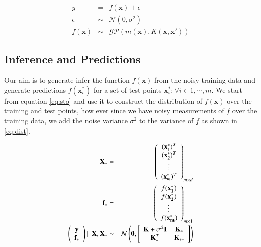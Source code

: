\documentclass[referee,a4paper,12pt,traditabstract]{swsc}
\begin{document}
\begin{linenumbers}
\begin{eqnarray}
      y & = & f(\mathbf{x}) + \epsilon  \\
      \epsilon & \sim & \mathcal{N}(0, \sigma^2) \\
      f(\mathbf{x}) & \sim & \mathcal{GP}(m(\mathbf{x}), K(\mathbf{x},\mathbf{x}')) 
\end{eqnarray}


\subsection{Inference and Predictions}

Our aim is to generate infer the function $f(\mathbf{x})$ from the noisy training data and generate predictions $f(\mathbf{x}^{*}_i)$ for a set of test points $ {\mathbf{x}^{*}_i : \forall i \in 1, \cdots, m} $. We start from equation \ref{eq:sto} and use it to construct the distribution of $f(\mathbf{x})$ over the training and test points, how ever since we have noisy measurements of $f$ over the training data, we add the noise variance $\sigma^2$ to the variance of $f$ as shown in \ref{eq:dist}.

\begin{eqnarray}
    \mathbf{X}_* & = & \left( \begin{array}{c} (\mathbf{x}^{*}_1)^T \\ (\mathbf{x}^{*}_2)^T \\ \vdots \\ (\mathbf{x}^{*}_m)^T \end{array} \right)_{m \times d} \\
    \mathbf{f}_* & = & \left( \begin{array}{c} f(\mathbf{x^{*}_1}) \\ f(\mathbf{x^{*}_2}) \\ \vdots \\ f(\mathbf{x^{*}_m}) \end{array} \right)_{m \times 1} \\
     \vspace{4\baselineskip}
    \left( \begin{array}{c} \mathbf{y} \\ \mathbf{f_*} \end{array} \right) | \ \ \mathbf{X}, \mathbf{X}_* & \sim & 
    \mathcal{N}\left(\mathbf{0}, \left[ \begin{array}{cc} \mathbf{K} + \sigma^{2} \mathbf{I} & \mathbf{K}_{*} \\ \mathbf{K}_{*}^T & \mathbf{K}_{**} \end{array} \right ] \right) \label{eq:dist}
\end{eqnarray}


\end{linenumbers}
\end{document}

